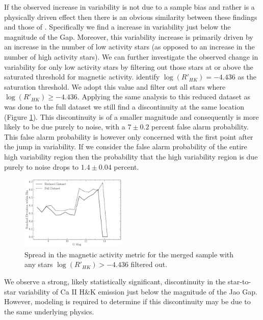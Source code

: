 If the observed increase in variability is not due to a sample bias and rather
is a physically driven effect then there is an obvious similarity between these
findings and those of \citet{Jao2023}. Specifically we find a increase in
variability just below the magnitude of the Gap. Moreover, this variability
increase is primarily driven by an increase in the number of low activity stars
(as opposed to an increase in the number of high activity stars). We can
further investigate the observed change in variability for only low activity
stars by filtering out those stars at or above the saturated threshold for
magnetic activity. \citet{Boudreaux2022} identify $\log(R'_{HK}) = -4.436$ as
the saturation threshold. We adopt this value and filter out all stars where
$\log(R'_{HK}) \geq -4.436$. Applying the same analysis to this reduced dataset
as was done to the full dataset we still find a discontinuity at the same
location (Figure \ref{fig:reduced}). This discontinuity is of a smaller
magnitude and consequently is more likely to be due purely to noise, with a
$7\pm0.2$ percent false alarm probability. This false alarm probability is
however only concerned with the first point after the jump in variability. If
we consider the false alarm probability of the entire high variability region
then the probability that the high variability region is due purely to noise
drops to $1.4\pm0.04$ percent.

\begin{figure}
  \centering
  \includegraphics[width=0.45\textwidth]{figures/ReducedDeviation.pdf}
  \caption{Spread in the magnetic activity metric for the merged sample with
  any stars $\log(R'_{HK}) > -4.436$ filtered out.}
  \label{fig:reduced}
\end{figure}

We observe a strong, likely statistically significant, discontinuity in the
star-to-star variability of Ca II H\&K emission just below the magnitude
of the Jao Gap. However, modeling is required to determine if this discontinuity
may be due to the same underlying physics.

